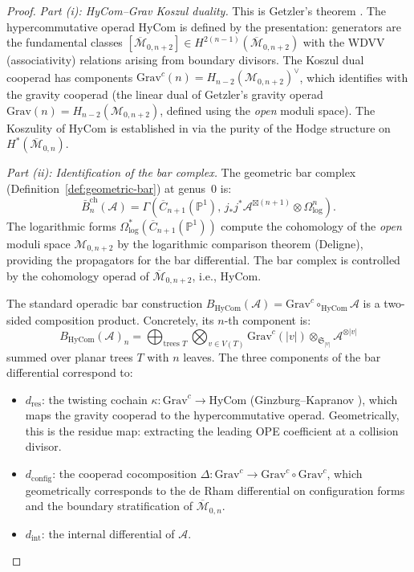 \begin{proof}
\emph{Part (i): HyCom--Grav Koszul duality.}
This is Getzler's theorem \cite[Theorem~2.3]{Get95}. The
hypercommutative operad $\mathrm{HyCom}$ is defined by the
presentation: generators are the fundamental classes
$[\overline{\mathcal{M}}_{0,n+2}] \in H^{2(n-1)}(
\overline{\mathcal{M}}_{0,n+2})$ with the WDVV (associativity)
relations arising from boundary divisors. The Koszul dual cooperad
has components $\mathrm{Grav}^c(n) = H_{n-2}(
\mathcal{M}_{0,n+2})^{\vee}$, which identifies with the gravity
cooperad (the linear dual of Getzler's gravity operad
$\mathrm{Grav}(n) = H_{n-2}(\mathcal{M}_{0,n+2})$, defined using
the \emph{open} moduli space). The Koszulity of $\mathrm{HyCom}$ is
established in \cite[Theorem~2.3]{Get95} via the purity of the Hodge
structure on $H^*(\overline{\mathcal{M}}_{0,n})$.

\emph{Part (ii): Identification of the bar complex.}
The geometric bar complex (Definition~\ref{def:geometric-bar}) at
genus~$0$ is:
\[
\bar{B}^{\mathrm{ch}}_n(\mathcal{A}) = \Gamma\!\left(
 \overline{C}_{n+1}(\mathbb{P}^1),\,
 j_*j^*\mathcal{A}^{\boxtimes(n+1)}
 \otimes \Omega^n_{\log}
\right).
\]
The logarithmic forms $\Omega^*_{\log}(\overline{C}_{n+1}(\mathbb{P}^1))$
compute the cohomology of the \emph{open} moduli space
$\mathcal{M}_{0,n+2}$ by the logarithmic comparison theorem (Deligne),
providing the propagators for the bar differential. The bar complex
is controlled by the cohomology operad of
$\overline{\mathcal{M}}_{0,n+2}$, i.e., $\mathrm{HyCom}$.

The standard operadic bar construction
$B_{\mathrm{HyCom}}(\mathcal{A}) = \mathrm{Grav}^c \circ_{\mathrm{HyCom}}
\mathcal{A}$ is a two-sided composition product. Concretely, its $n$-th
component is:
\[
B_{\mathrm{HyCom}}(\mathcal{A})_n
= \bigoplus_{\text{trees } T} \bigotimes_{v \in V(T)}
 \mathrm{Grav}^c(|v|) \otimes_{\mathfrak{S}_{|v|}} \mathcal{A}^{\otimes |v|}
\]
summed over planar trees $T$ with $n$ leaves. The three components of
the bar differential correspond to:
\begin{itemize}
\item $d_{\mathrm{res}}$: the twisting cochain
 $\kappa\colon \mathrm{Grav}^c \to \mathrm{HyCom}$
 (Ginzburg--Kapranov \cite[§2.1]{GK94}), which maps
 the gravity cooperad to the hypercommutative operad. Geometrically,
 this is the residue map: extracting the leading OPE coefficient at
 a collision divisor.
\item $d_{\mathrm{config}}$: the cooperad cocomposition
 $\Delta\colon \mathrm{Grav}^c \to \mathrm{Grav}^c \circ
 \mathrm{Grav}^c$, which geometrically corresponds to the de Rham
 differential on configuration forms and the
 boundary stratification of $\overline{\mathcal{M}}_{0,n}$.
\item $d_{\mathrm{int}}$: the internal differential of $\mathcal{A}$.
\end{itemize}


\end{proof}
